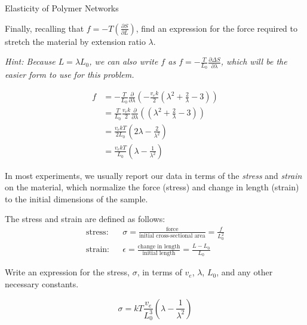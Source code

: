 \begin{activity}{Elasticity of Polymer Networks}
\begin{ctqs}
	\question Finally, recalling that $f = -T\left(\frac{\partial S}{\partial L}\right)$, find an expression for the force required to stretch the material by extension ratio $\lambda$.
	
		\emph{Hint: Because $L = \lambda L_0$, we can also write $f$ as $f = -\frac{T}{L_0}\frac{\partial \Delta S}{\partial \lambda}$, which will be the easier form to use for this problem.}
		
			\begin{solution}[2.5in]
			
				\begin{align*}
					f &= -\frac{T}{L_0}\frac{\partial}{\partial \lambda} \left(-\frac{v_e k}{2}\left(\lambda^2 + \frac{2}{\lambda} - 3\right)\right)\\
						&= \frac{T}{L_0}\frac{v_e k}{2}\frac{\partial}{\partial \lambda} \left(\left(\lambda^2 + \frac{2}{\lambda} - 3\right)\right)\\
						&= \frac{v_e k T}{2 L_0}\left(2\lambda - \frac{2}{\lambda^2} \right)\\
						&= \frac{v_e k T}{L_0}\left(\lambda - \frac{1}{\lambda^2} \right)
				\end{align*}
			\end{solution}
	
\end{ctqs}

\begin{model}

	In most experiments, we usually report our data in terms of the \emph{stress} and \emph{strain} on the material, which normalize the force (stress) and change in length (strain) to the initial dimensions of the sample.
	
	The stress and strain are defined as follows:
	\begin{align*}
		\text{stress:} && \sigma = \frac{\text{force}}{\text{initial cross-sectional area}} = \frac{f}{L_0^2} \\
		\text{strain:} && \epsilon = \frac{\text{change in length}}{\text{initial length}} = \frac{L-L_0}{L_0}
	\end{align*}
	
\end{model}

\begin{ctqs}

	\question Write an expression for the stress, $\sigma$, in terms of $v_e$, $\lambda$, $L_0$, and any other necessary constants.
	
		\begin{solution}[0.8in]
			\begin{equation*}
				\sigma = kT\frac{v_e}{L_0^3}\left(\lambda - \frac{1}{\lambda^2}\right)
			\end{equation*}
		\end{solution}


\end{ctqs}
\end{activity}
